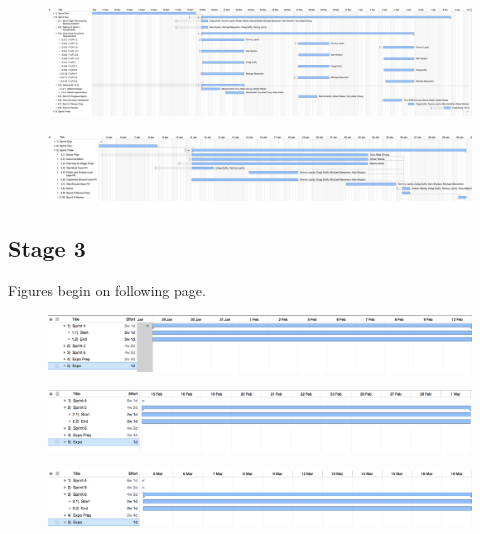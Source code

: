\documentclass[11pt, a4paper]{report}
\begin{document}
\begin{figure}
\centering
\includegraphics[scale=0.25]{Figures/Plan2-2.png}
\end{figure}

\begin{figure}
\centering
\includegraphics[scale=0.3]{Figures/Plan2-3.png}
\end{figure}


\pagebreak
\subsection{Stage 3}

Figures begin on following page.

\begin{figure}
\centering
\includegraphics[scale=0.45]{Figures/Plan3-4.png}
\end{figure}

\begin{figure}
\centering
\includegraphics[scale=0.45]{Figures/Plan3-5.png}
\end{figure}

\begin{figure}
\centering
\includegraphics[scale=0.45]{Figures/Plan3-6.png}
\end{figure}
\end{document}
